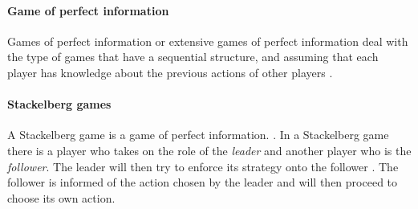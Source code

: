 \paragraph{Game of perfect information}
Games of perfect information or extensive games of perfect information deal with the type of games that have a sequential structure, and assuming that each player has knowledge about the previous actions of other players \cite{CourseInGameTheory}.

\paragraph{Stackelberg games}
A Stackelberg game is a game of perfect information. \cite{CourseInGameTheory}.
In a Stackelberg game there is a player who takes on the role of the \textit{leader} and another player who is the \textit{follower}. The leader will then try to enforce its strategy onto the follower \cite{ShohamLeyton-Brown2008}. The follower is informed of the action chosen by the leader and will then proceed to choose its own action.
